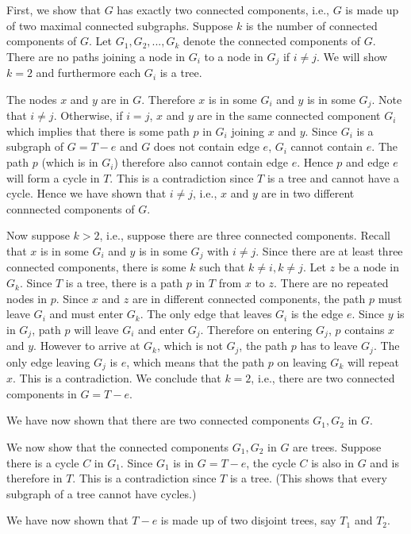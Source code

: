First, we show that $G$ has exactly two connected components, i.e.,
$G$ is made up of two maximal connected subgraphs.
Suppose $k$ is the number of connected components of $G$.
Let $G_1, G_2, ..., G_k$ denote the connected components of $G$.
There are no paths joining a node in $G_i$ to a node in $G_j$ if $i \neq j$.
We will show $k = 2$ and furthermore each $G_i$ is a tree.

The nodes $x$ and $y$ are in $G$.
Therefore $x$ is in some $G_i$ and $y$ is in some $G_j$.
Note that $i \neq j$.
Otherwise, if $i = j$, $x$ and $y$ are in the same connected component
$G_i$ which implies that there is some path $p$ in $G_i$ joining $x$ and $y$.
Since $G_i$ is a subgraph of $G = T - e$ and $G$ does not contain edge $e$,
$G_i$ cannot contain $e$.
The path $p$ (which is in $G_i$) therefore also cannot contain edge $e$.
Hence $p$ and edge $e$ will form a cycle in $T$.
This is a contradiction since $T$ is a tree and cannot have a cycle.
Hence we have shown that $i \neq j$, i.e., $x$ and $y$ are in two different
connnected components of $G$.

Now suppose $k > 2$, i.e.,
suppose there are three connected components.
Recall that $x$ is in some $G_i$ and $y$ is in some $G_j$
with $i \neq j$.
Since there are at least three connected components, there is some
$k$
such that $k \neq i, k \neq j$. 
Let $z$ be a node in $G_k$.
Since $T$ is a tree, there is a path $p$ in $T$ from $x$ to $z$.
There are no repeated nodes in $p$. 
Since $x$ and $z$ are in different connected components,
the path $p$ must leave $G_i$ and must enter $G_k$.
The only edge that leaves $G_i$ is the edge $e$.
Since $y$ is in $G_j$,
path $p$ will leave $G_i$ and enter $G_j$.
Therefore on entering $G_j$, $p$ contains $x$ and $y$.
However to arrive at $G_k$, which is not $G_j$,
the path $p$ has to leave $G_j$.
The only edge leaving $G_j$ is $e$, which means that
the path $p$ on leaving $G_k$ will repeat $x$.
This is a contradiction.
We conclude that $k = 2$, i.e., there are two
connected components in $G = T - e$.

We have now shown that there are two connected components $G_1, G_2$ in $G$.

We now show that the connected components $G_1, G_2$ in $G$
are trees.
Suppose there is a cycle $C$ in $G_1$.
Since $G_1$ is in $G = T - e$, the cycle $C$ is also in $G$
and is therefore in $T$.
This is a contradiction since $T$ is a tree.
(This shows that every subgraph of a tree cannot have cycles.)

We have now shown that $T - e$ is made up of two
disjoint trees, say $T_1$ and $T_2$.

